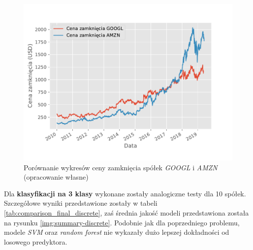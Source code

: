 \documentclass[a4paper, twoside, 11pt, openright]{article}
\begin{document}
\begin{figure}[H]
\centering \includegraphics[scale=1]{img/AMZN_GOOGL_close_comparison.pdf}
\caption{Porównanie wykresów ceny zamknięcia spółek \textit{GOOGL} i \textit{AMZN} (opracowanie własne)}
\label{img:amzn_googl_adjusted_comparison}
\end{figure}

\bigskip

Dla \textbf{klasyfikacji na 3 klasy} wykonane zostały analogiczne testy dla 10 spółek. Szczegółowe wyniki przedstawione zostały w tabeli \ref{tab:comparison_final_discrete}, zaś średnia jakość modeli  przedstawiona została na rysunku \ref{img:summary-discrete}. Podobnie jak dla poprzedniego problemu, modele \textit{SVM} oraz \textit{random forest} nie wykazały dużo lepszej dokładności od losowego predyktora. 
\end{document}
